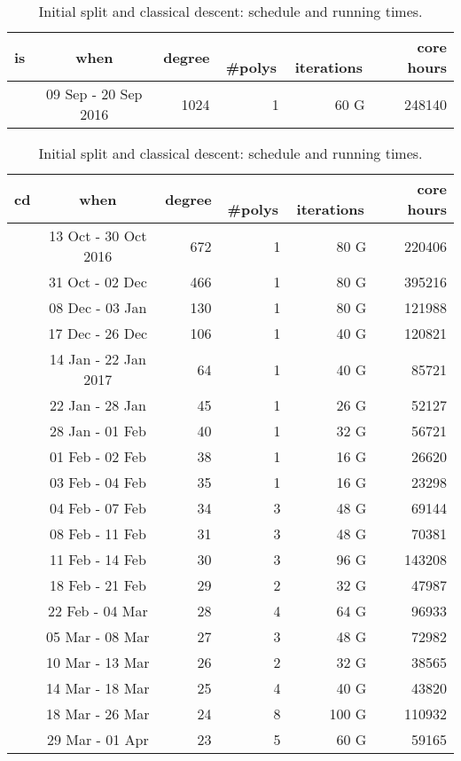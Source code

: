 \documentclass[11pt]{llncs}
\begin{document}
\begin{table}
  \begin{center}
    \caption{Initial split and classical descent: schedule and
      running times.} \label{tab:cd} \small
    \begin{tabular}{ccrrrr}
      is & when & degree & \,\#polys\, & \,iterations\, & core hours \\\hline
         & 09 Sep - 20 Sep 2016 & 1024 & 1 & 60 G & \num{248140}
    \end{tabular} \medskip\par
    \begin{tabular}{ccrrrr}
      cd & when & degree & \,\#polys\, & \,iterations\, & core hours \\\hline
  & 13 Oct - 30 Oct 2016 & 672 & 1 & 80 G & \num{220406} \\
       & 31 Oct - 02 Dec & 466 & 1 & 80 G & \num{395216} \\
       & 08 Dec - 03 Jan & 130 & 1 & 80 G & \num{121988} \\
       & 17 Dec - 26 Dec & 106 & 1 & 40 G & \num{120821} \\
  & 14 Jan - 22 Jan 2017 & 64 & 1 & 40 G & \num{85721} \\
       & 22 Jan - 28 Jan & 45 & 1 & 26 G & \num{52127} \\
       & 28 Jan - 01 Feb & 40 & 1 & 32 G & \num{56721} \\
       & 01 Feb - 02 Feb & 38 & 1 & 16 G & \num{26620} \\
       & 03 Feb - 04 Feb & 35 & 1 & 16 G & \num{23298} \\
       & 04 Feb - 07 Feb & 34 & 3 & 48 G & \num{69144} \\
       & 08 Feb - 11 Feb & 31 & 3 & 48 G & \num{70381} \\
       & 11 Feb - 14 Feb & 30 & 3 & 96 G & \num{143208} \\
       & 18 Feb - 21 Feb & 29 & 2 & 32 G & \num{47987} \\
       & 22 Feb - 04 Mar & 28 & 4 & 64 G & \num{96933} \\
       & 05 Mar - 08 Mar & 27 & 3 & 48 G & \num{72982} \\
       & 10 Mar - 13 Mar & 26 & 2 & 32 G & \num{38565} \\
       & 14 Mar - 18 Mar & 25 & 4 & 40 G & \num{43820} \\
       & 18 Mar - 26 Mar & 24 & 8 & 100 G & \num{110932} \\
       & 29 Mar - 01 Apr & 23 & 5 & 60 G & \num{59165} \\

\end{tabular}
\end{center}
\end{table}
\end{document}

